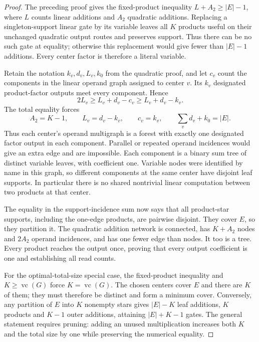 \documentclass[11pt]{article}
\newcommand{\vc}{\operatorname{vc}}
\theoremstyle{definition}
\theoremstyle{remark}
\begin{document}
\begin{proof}
The preceding proof gives the fixed-product inequality $L+A_2\ge|E|-1$, where $L$ counts linear additions and $A_2$ quadratic additions. Replacing a singleton-support linear gate by its variable leaves all $K$ products useful on their unchanged quadratic output routes and preserves support. Thus there can be no such gate at equality; otherwise this replacement would give fewer than $|E|-1$ additions. Every center factor is therefore a literal variable.

Retain the notation $k_v,d_v,L_v,k_0$ from the quadratic proof, and let $c_v$ count the components in the linear operand graph assigned to center $v$. Its $k_v$ designated product-factor outputs meet every component. Hence
\[
 2L_v\ge L_v+d_v-c_v\ge L_v+d_v-k_v.
\]
The total equality forces
\[
 A_2=K-1,\qquad L_v=d_v-k_v,\qquad c_v=k_v,
 \qquad \sum_v d_v+k_0=|E|.
\]
Thus each center's operand multigraph is a forest with exactly one designated factor output in each component. Parallel or repeated operand incidences would give an extra edge and are impossible. Each component is a binary sum tree of distinct variable leaves, with coefficient one. Variable nodes were identified by name in this graph, so different components at the same center have disjoint leaf supports. In particular there is no shared nontrivial linear computation between two products at that center.

The equality in the support-incidence sum now says that all product-star supports, including the one-edge products, are pairwise disjoint. They cover $E$, so they partition it. The quadratic addition network is connected, has $K+A_2$ nodes and $2A_2$ operand incidences, and has one fewer edge than nodes. It too is a tree. Every product reaches the output once, proving that every output coefficient is one and establishing all read counts.

For the optimal-total-size special case, the fixed-product inequality and $K\ge\vc(G)$ force $K=\vc(G)$. The chosen centers cover $E$ and there are $K$ of them; they must therefore be distinct and form a minimum cover. Conversely, any partition of $E$ into $K$ nonempty stars gives $|E|-K$ leaf additions, $K$ products and $K-1$ outer additions, attaining $|E|+K-1$ gates. The general statement requires pruning: adding an unused multiplication increases both $K$ and the total size by one while preserving the numerical equality.
\end{proof}
\end{document}
